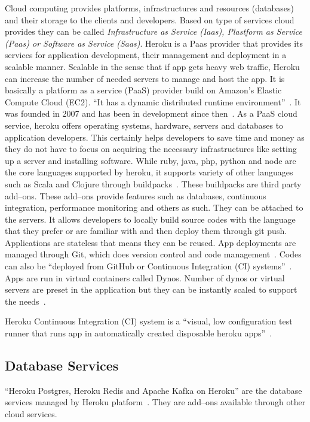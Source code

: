  Cloud computing provides platforms, infrastructures and resources (databases)
 and their storage to the clients and developers. Based on type of services
 cloud provides they can be called \textit{Infrastructure as Service (Iaas),
 Plastform as Service (Paas) or Software as Service (Saas)}. Heroku is a Paas
 provider that provides its services for application development, their management and
 deployment in a scalable manner. Scalable in the sense that if app gets 
 heavy web traffic, Heroku can increase the number of needed servers to manage
 and host the app. It is basically a platform as a service (PaaS) provider
 build on Amazon's Elastic Compute Cloud (EC2). ``It has a dynamic distributed
 runtime environment''~\cite{hid-sp18-415-www-devcenter-heroku}. It was founded
 in  2007 and has been
 in development since then~\cite{hid-sp18-415-www-wikipedia-org}.
 As a PaaS cloud service, heroku
 offers operating systems, hardware, servers and databases to application 
 developers. This certainly helps developers to save time and money as they do
 not have to focus on acquiring the necessary infrastructures like setting up 
 a server and installing software. While ruby, java, php, python and node are 
 the core languages supported by heroku, it supports variety 
 of other languages such as Scala and Clojure through 
 buildpacks~\cite{hid-sp18-415-www-wikipedia-org}.
 These buildpacks are third party add--ons. These add--ons provide features such as
 databases, continuous integration, performance monitoring and others as such. 
 They can be attached to the servers. It allows developers to locally build 
 source codes with the language that they prefer or are familiar with and then
 deploy them through git push. Applications are stateless that means they can 
 be reused. App deployments are managed through Git, which does version control
 and code management~\cite{hid-sp18-415-www-how-heroku-works}. Codes can also
 be ``deployed from GitHub or Continuous Integration (CI) 
 systems''~\cite{hid-sp18-415-www-heroku-com}.   
 Apps are run in virtual containers called Dynos. Number of dynos or virtual 
 servers are preset in the application but they can be instantly scaled to 
 support the needs~\cite{hid-sp18-415-www-how-heroku-works}.

 Heroku Continuous Integration (CI) system is a ``visual, low configuration
 test runner that runs app in automatically created disposable 
 heroku apps''~\cite{hid-sp18-415-www-heroku-ci}.

\subsection{Database Services}
 ``Heroku Postgres, Heroku Redis and Apache Kafka on Heroku'' are the database
 services managed by Heroku platform~\cite{hid-sp18-415-www-heroku-com}.
 They are add--ons available through other cloud services.
 
